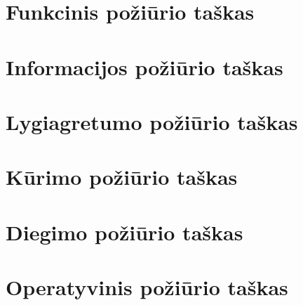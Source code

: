 \documentclass{VUMIFPSmagistrinis}
\begin{document}
			
		\section{Funkcinis požiūrio taškas}
		\section{Informacijos požiūrio taškas}
		\section{Lygiagretumo požiūrio taškas}
		\section{Kūrimo požiūrio taškas}
		\section{Diegimo požiūrio taškas}
		\section{Operatyvinis požiūrio taškas}
		
\end{document}

